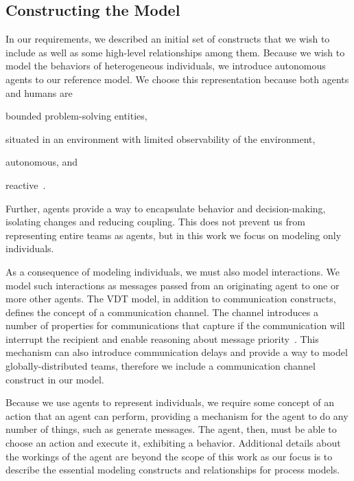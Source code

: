 \subsection{Constructing the Model}

In our requirements, we described an initial
set of constructs that we wish to include as well as some high-level
relationships among them.  Because we wish to model the behaviors of
heterogeneous individuals, we introduce autonomous agents to our reference
model.  We choose this representation because both agents and humans are
\begin{inparaenum}[(1)]
    \item bounded problem-solving entities, \item situated in an environment
    with limited observability of the
        environment,
    \item autonomous, and \item reactive~\cite{jennings_agent-based_2000,
    crowder_development_2012}.
\end{inparaenum} 
Further, agents provide a way to encapsulate behavior and decision-making,
isolating changes and reducing coupling.  This does not prevent us from
representing entire teams as agents, but in this work we focus on modeling only
individuals.

As a consequence of modeling individuals, we must also model interactions.  We
model such interactions as messages passed from an originating agent to one or
more other agents.  The VDT model, in addition to communication constructs,
defines the concept of a communication channel.  The channel introduces a number
of properties for communications that capture if the communication will
interrupt the recipient and enable reasoning about message
priority~\cite{jin_virtual_1996}.  This mechanism can also introduce
communication delays and provide a way to model globally-distributed teams,
therefore we include a communication channel construct in our model.

Because we use agents to represent individuals, we require some concept of an
action that an agent can perform, providing a mechanism for the agent to do any
number of things, such as generate messages.  The agent, then, must be able to
choose an action and execute it, exhibiting a behavior.  Additional details
about the workings of the agent are beyond the scope of this work as our focus
is to describe the essential modeling constructs and relationships for process
models.

